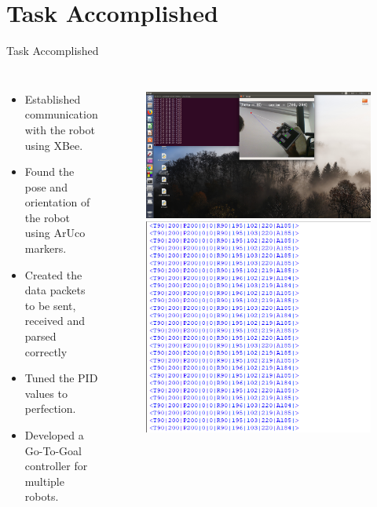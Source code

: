 \documentclass[10pt,a4paper]{beamer}
\begin{document}
\section{Task Accomplished}
\begin{frame}{Task Accomplished}
\begin{columns}
	\begin{itemize}
		\item Established communication with the robot using XBee.\pause
		\item Found the pose and orientation of the robot using ArUco markers.\pause
		\item Created the data packets to be sent, received and parsed correctly\pause
		\item Tuned the PID values to perfection.\pause
		\item Developed a Go-To-Goal controller for multiple robots.\pause
		
	\end{itemize}
	
\begin{figure}
\includegraphics[height=0.35\textheight]{Screenshot_org.png}\pause\vspace{1 em}
\includegraphics[height=0.35\textheight]{xbee_packet.png}


\end{figure}
\end{columns}
\end{frame}
\end{document}
